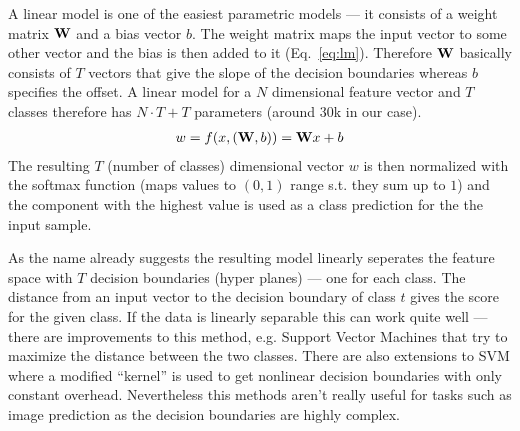 A linear model is one of the easiest parametric models --- it consists of a weight matrix $\textbf W$ and a bias vector $b$. The weight matrix maps the input vector to some other vector and the bias is then added to it (Eq.~\eqref{eq:lm}). Therefore $\textbf W$ basically consists of $T$ vectors that give the slope of the decision boundaries whereas $b$ specifies the offset. A linear model for a $N$ dimensional feature vector and $T$ classes therefore has $N \cdot T + T$ parameters (around 30k in our case).
\begin{align}
 w = f(x, (\textbf W,  b)) =\textbf  Wx +  b \label{eq:lm}
\end{align}
The resulting $T$ (number of classes) dimensional vector $w$ is then normalized with the softmax function (maps values to $(0,1)$ range s.t. they sum up to $1$) and the component with the highest value is used as a class prediction for the the input sample.

As the name already suggests the resulting model linearly seperates the feature space with $T$ decision boundaries (hyper planes) --- one for each class. The distance from an input vector to the decision boundary of class $t$ gives the score for the given class. If the data is linearly separable this can work quite well --- there are improvements to this method, e.g. Support Vector Machines that try to maximize the distance between the two classes. There are also extensions to SVM where a modified ``kernel'' is used to get nonlinear decision boundaries with only constant overhead. Nevertheless this methods aren't really useful for tasks such as image prediction as the decision boundaries are highly complex.

